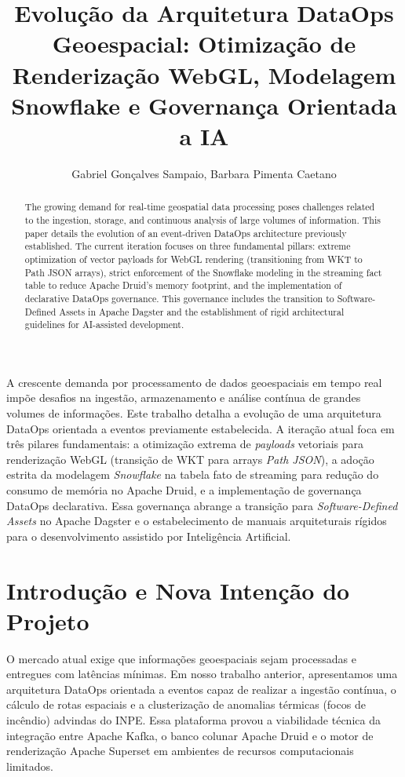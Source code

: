 \documentclass[12pt]{article}
\title{Evolução da Arquitetura DataOps Geoespacial: Otimização de Renderização WebGL, Modelagem Snowflake e Governança Orientada a IA}
\author{Gabriel Gonçalves Sampaio\inst{1}, Barbara Pimenta Caetano\inst{1}}
\begin{document}
\maketitle

\begin{abstract}
  The growing demand for real-time geospatial data processing poses challenges related to the ingestion, storage, and continuous analysis of large volumes of information. This paper details the evolution of an event-driven DataOps architecture previously established. The current iteration focuses on three fundamental pillars: extreme optimization of vector payloads for WebGL rendering (transitioning from WKT to Path JSON arrays), strict enforcement of the Snowflake modeling in the streaming fact table to reduce Apache Druid's memory footprint, and the implementation of declarative DataOps governance. This governance includes the transition to Software-Defined Assets in Apache Dagster and the establishment of rigid architectural guidelines for AI-assisted development.
\end{abstract}

\begin{resumo}
  A crescente demanda por processamento de dados geoespaciais em tempo real impõe desafios na ingestão, armazenamento e análise contínua de grandes volumes de informações. Este trabalho detalha a evolução de uma arquitetura DataOps orientada a eventos previamente estabelecida. A iteração atual foca em três pilares fundamentais: a otimização extrema de \textit{payloads} vetoriais para renderização WebGL (transição de WKT para arrays \textit{Path JSON}), a adoção estrita da modelagem \textit{Snowflake} na tabela fato de streaming para redução do consumo de memória no Apache Druid, e a implementação de governança DataOps declarativa. Essa governança abrange a transição para \textit{Software-Defined Assets} no Apache Dagster e o estabelecimento de manuais arquiteturais rígidos para o desenvolvimento assistido por Inteligência Artificial.
\end{resumo}

\section{Introdução e Nova Intenção do Projeto}

O mercado atual exige que informações geoespaciais sejam processadas e entregues com latências mínimas. Em nosso trabalho anterior, apresentamos uma arquitetura DataOps orientada a eventos capaz de realizar a ingestão contínua, o cálculo de rotas espaciais e a clusterização de anomalias térmicas (focos de incêndio) advindas do INPE. Essa plataforma provou a viabilidade técnica da integração entre Apache Kafka, o banco colunar Apache Druid e o motor de renderização Apache Superset em ambientes de recursos computacionais limitados.
\end{document}
